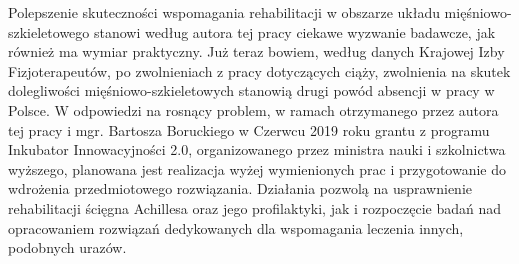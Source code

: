 Polepszenie skuteczności wspomagania rehabilitacji w obszarze układu mięśniowo-szkieletowego stanowi według autora tej pracy ciekawe wyzwanie badawcze, jak również ma wymiar praktyczny. Już teraz bowiem, według danych Krajowej Izby Fizjoterapeutów, po zwolnieniach z pracy dotyczących ciąży, zwolnienia na skutek dolegliwości mięśniowo-szkieletowych stanowią drugi powód absencji w pracy w Polsce. W odpowiedzi na rosnący problem, w ramach otrzymanego przez autora tej pracy i mgr. Bartosza Boruckiego w Czerwcu 2019 roku grantu z programu Inkubator Innowacyjności 2.0, organizowanego przez ministra nauki i szkolnictwa wyższego, planowana jest realizacja wyżej wymienionych prac i przygotowanie do wdrożenia przedmiotowego rozwiązania. Działania pozwolą na usprawnienie rehabilitacji ścięgna Achillesa oraz jego profilaktyki, jak i rozpoczęcie badań nad opracowaniem rozwiązań dedykowanych dla wspomagania leczenia innych, podobnych urazów.






